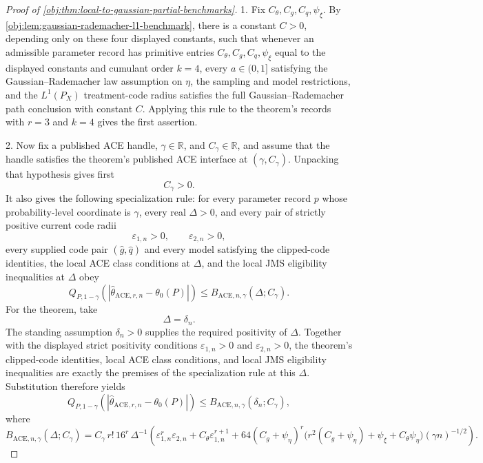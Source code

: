 \documentclass[11pt]{article}
\begin{document}
\begin{proof}[Proof of \cref{obj:thm:local-to-gaussian-partial-benchmarks}]
1.  Fix \(C_{\theta},C_g,C_q,\psi_{\xi}\).  By
\cref{obj:lem:gaussian-rademacher-l1-benchmark}, there is a constant
\(C>0\), depending only on these four displayed constants, such that whenever
an admissible parameter record has primitive entries
\(C_{\theta},C_g,C_q,\psi_{\xi}\) equal to the displayed constants and
cumulant order \(k=4\), every \(a\in(0,1]\) satisfying the
Gaussian--Rademacher law assumption on \(\eta\), the sampling and model
restrictions, and the \(L^1(P_X)\) treatment-code radius satisfies the full
Gaussian--Rademacher path conclusion with constant \(C\).  Applying this rule
to the theorem's records with \(r=3\) and \(k=4\) gives the first assertion. %

2.  Now fix a published ACE handle, \(\gamma\in\mathbb R\), and
\(C_{\gamma}\in\mathbb R\), and assume that the handle satisfies the theorem's
published ACE interface at \((\gamma,C_{\gamma})\).  Unpacking that hypothesis
gives first
\[
C_{\gamma}>0.
\]
It also gives the following specialization rule: for every parameter record
\(p\) whose probability-level coordinate is \(\gamma\), every real
\(\Delta>0\), and every pair of strictly positive current code radii
\[
\varepsilon_{1,n}>0,
\qquad
\varepsilon_{2,n}>0,
\]
every supplied code pair \((\widehat g,\widehat q)\) and every model satisfying
the clipped-code identities, the local ACE class conditions at \(\Delta\), and
the local JMS eligibility inequalities at \(\Delta\) obey
\[
Q_{P,1-\gamma}
\!\left(\left|\widehat\theta_{\mathrm{ACE},r,n}-\theta_0(P)\right|\right)
\le
B_{\mathrm{ACE},n,\gamma}(\Delta;C_{\gamma}).
\]
For the theorem, take
\[
\Delta=\delta_n .
\]
The standing assumption \(\delta_n>0\) supplies the required positivity of
\(\Delta\).  Together with the displayed strict positivity conditions
\(\varepsilon_{1,n}>0\) and \(\varepsilon_{2,n}>0\), the theorem's clipped-code
identities, local ACE class conditions, and local JMS eligibility inequalities
are exactly the premises of the specialization rule at this \(\Delta\).
Substitution therefore yields
\[
Q_{P,1-\gamma}
\!\left(\left|\widehat\theta_{\mathrm{ACE},r,n}-\theta_0(P)\right|\right)
\le
B_{\mathrm{ACE},n,\gamma}(\delta_n;C_{\gamma}),
\]
where
\[
B_{\mathrm{ACE},n,\gamma}(\Delta;C_{\gamma})
=
C_{\gamma}\,r!\,16^r\,\Delta^{-1}
\left(
\varepsilon_{1,n}^r\varepsilon_{2,n}
+C_{\theta}\varepsilon_{1,n}^{r+1}
+64(C_g+\psi_{\eta})^r
\bigl(r^2(C_g+\psi_{\eta})+\psi_{\xi}+C_{\theta}\psi_{\eta}\bigr)
(\gamma n)^{-1/2}
\right).
\]
\end{proof}
\end{document}
